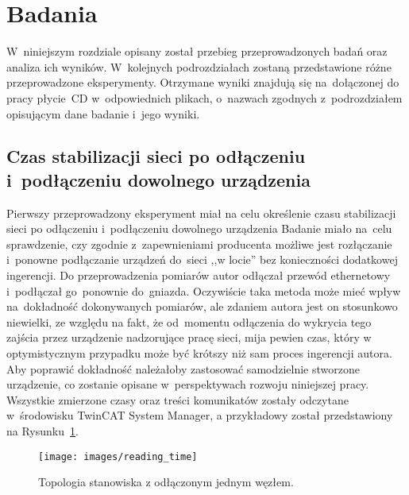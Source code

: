 \section{Badania}
W~niniejszym rozdziale opisany został przebieg przeprowadzonych badań oraz analiza ich wyników. W~kolejnych podrozdziałach zostaną przedstawione różne przeprowadzone eksperymenty. Otrzymane wyniki znajdują się na~dołączonej do pracy płycie~CD w~odpowiednich plikach, o~nazwach zgodnych z~podrozdziałem opisującym dane badanie i~jego wyniki.

\subsection{Czas stabilizacji sieci po odłączeniu i~podłączeniu dowolnego urządzenia}
Pierwszy przeprowadzony eksperyment miał na celu określenie czasu stabilizacji sieci po odłączeniu i~podłączeniu dowolnego urządzenia Badanie miało na~celu sprawdzenie, czy zgodnie z~zapewnieniami producenta możliwe jest rozłączanie i~ponowne podłączanie urządzeń do~sieci ,,w locie'' bez konieczności dodatkowej ingerencji. Do przeprowadzenia pomiarów autor odłączał przewód ethernetowy i~podłączał go~ponownie do~gniazda. Oczywiście taka metoda może mieć wpływ na~dokładność dokonywanych pomiarów, ale zdaniem autora jest on stosunkowo niewielki, ze względu na fakt, że od~momentu odłączenia do wykrycia tego zajścia przez urządzenie nadzorujące pracę sieci, mija pewien czas, który w optymistycznym przypadku może być krótszy niż sam proces ingerencji autora. Aby poprawić dokładność należałoby zastosować samodzielnie stworzone urządzenie, co zostanie opisane w~perspektywach rozwoju niniejszej pracy. Wszystkie zmierzone czasy oraz treści komunikatów zostały odczytane w~środowisku TwinCAT System Manager, a przykładowy został przedstawiony na Rysunku~\ref{reading_time}.

\begin{figure}[!htb] 	\centering 	\texttt{[image: images/reading\_time]} \caption{Topologia stanowiska z odłączonym jednym węzłem.} \label{reading_time} \end{figure}

